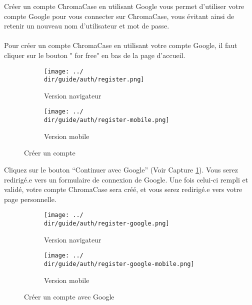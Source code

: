 Créer un compte ChromaCase en utilisant Google vous permet d’utiliser votre compte Google pour vous connecter sur ChromaCase, vous évitant ainsi de retenir un nouveau nom d’utilisateur et mot de passe.
\\\\
Pour créer un compte ChromaCase en utilisant votre compte Google, il faut cliquer sur le bouton " for free" en bas de la page d'accueil.

\begin{figure}[H]
	\begin{subfigure}[b]{0.7\textwidth}
		\texttt{[image: ../\\dir/guide/auth/register.png]}
		\caption{Version navigateur}
	\end{subfigure}
	\begin{subfigure}[b]{0.25\textwidth}
		\texttt{[image: ../\\dir/guide/auth/register-mobile.png]}
		\caption{Version mobile}
	\end{subfigure}
	\caption{Créer un compte}
\end{figure}

Cliquez sur le bouton “Continuer avec Google” (Voir Capture \ref{fig:signup-google}). Vous serez redirigé.e vers un formulaire de connexion de Google. Une fois celui-ci rempli et validé, votre compte ChromaCase sera créé, et vous serez redirigé.e vers votre page personnelle.

\begin{figure}[H]
	\begin{subfigure}[b]{0.7\textwidth}
		\texttt{[image: ../\\dir/guide/auth/register-google.png]}
		\caption{Version navigateur}
	\end{subfigure}
	\begin{subfigure}[b]{0.25\textwidth}
		\texttt{[image: ../\\dir/guide/auth/register-google-mobile.png]}
		\caption{Version mobile}
	\end{subfigure}
	\caption{Créer un compte avec Google}
	\label{fig:signup-google}
\end{figure}